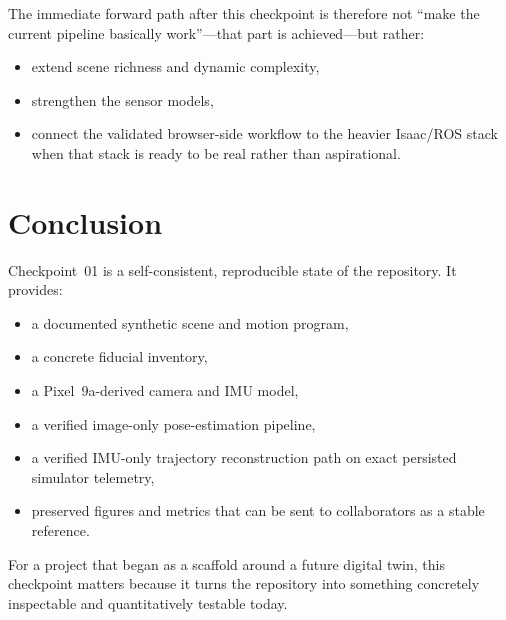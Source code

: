 \documentclass[11pt,a4paper]{article}
\begin{document}
The immediate forward path after this checkpoint is therefore not ``make the current pipeline basically work''---that part is achieved---but rather:

\begin{itemize}
  \item extend scene richness and dynamic complexity,
  \item strengthen the sensor models,
  \item connect the validated browser-side workflow to the heavier Isaac/ROS stack when that stack is ready to be real rather than aspirational.
\end{itemize}

\section{Conclusion}

Checkpoint~01 is a self-consistent, reproducible state of the repository.
It provides:

\begin{itemize}
  \item a documented synthetic scene and motion program,
  \item a concrete fiducial inventory,
  \item a Pixel~9a-derived camera and IMU model,
  \item a verified image-only pose-estimation pipeline,
  \item a verified IMU-only trajectory reconstruction path on exact persisted simulator telemetry,
  \item preserved figures and metrics that can be sent to collaborators as a stable reference.
\end{itemize}

For a project that began as a scaffold around a future digital twin, this checkpoint matters because it turns the repository into something concretely inspectable and quantitatively testable today.



\end{document}
